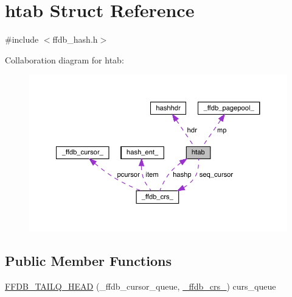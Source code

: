 \hypertarget{structhtab}{}\section{htab Struct Reference}
\label{structhtab}


{\ttfamily \#include $<$ffdb\+\_\+hash.\+h$>$}



Collaboration diagram for htab\+:\nopagebreak
\begin{figure}[H]
\begin{center}
\leavevmode
\includegraphics[width=350pt]{de/d56/structhtab__coll__graph}
\end{center}
\end{figure}
\subsection*{Public Member Functions}
\begin{DoxyCompactItemize}
\item 
\mbox{\hyperlink{structhtab_af19d4f4f4be39bcc1bca0509bef5c3cf}{F\+F\+D\+B\+\_\+\+T\+A\+I\+L\+Q\+\_\+\+H\+E\+AD}} (\+\_\+ffdb\+\_\+cursor\+\_\+queue, \mbox{\hyperlink{struct__ffdb__crs__}{\+\_\+ffdb\+\_\+crs\+\_\+}}) curs\+\_\+queue
\end{DoxyCompactItemize}
